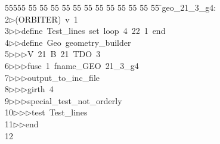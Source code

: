 %
%
\begin{tabbing}
55555 \= 55 \= 55 \= 55 \= 55 \= 55 \= 55 \= 55 \= 55 \= 55 \= 55 \= 55 \= 55 \= \>geo\_21\_3\_g4:\\[0pt]
2\>$\triangleright$\>(ORBITER)\ v\ 1\ \\[0pt]
3\>$\triangleright$\>$\triangleright$\>define\ Test\_lines\ set\ loop\ 4\ 22\ 1\ end\ \\[0pt]
4\>$\triangleright$\>$\triangleright$\>define\ Geo\ geometry\_builder\ \\[0pt]
5\>$\triangleright$\>$\triangleright$\>$\triangleright$\>V\ 21\ B\ 21\ TDO\ 3\ \\[0pt]
6\>$\triangleright$\>$\triangleright$\>$\triangleright$\>fuse\ 1\ fname\_GEO\ 21\_3\_g4\ \\[0pt]
7\>$\triangleright$\>$\triangleright$\>$\triangleright$\>output\_to\_inc\_file\ \\[0pt]
8\>$\triangleright$\>$\triangleright$\>$\triangleright$\>girth\ 4\ \\[0pt]
9\>$\triangleright$\>$\triangleright$\>$\triangleright$\>special\_test\_not\_orderly\ \\[0pt]
10\>$\triangleright$\>$\triangleright$\>$\triangleright$\>test\ Test\_lines\ \\[0pt]
11\>$\triangleright$\>$\triangleright$\>end\\[0pt]
12\>\end{tabbing}

